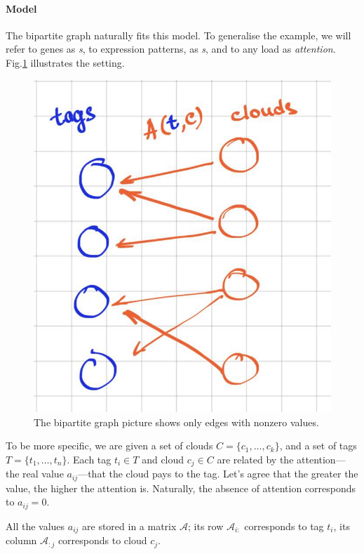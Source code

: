 \documentclass{llncs}
\begin{document}
\paragraph{Model} The bipartite graph naturally fits this model. To generalise the example, we will refer to genes as \textit{{\tag}s}, to expression patterns, as \textit{{\cloud}s}, and to any load as \textit{attention}. Fig.\ref{fig:nice_name} illustrates the setting.

\begin{figure}
    \centering
    \includegraphics[scale=.25]{bipartite.jpg}
    \caption{The bipartite graph picture shows only edges with nonzero values.}
    \label{fig:nice_name}
\end{figure}

To be more specific, we are given a set of clouds $C = \{c_1, \dots, c_k\}$, and a set of tags $T = \{t_1, \dots, t_n\}$.
Each tag $t_i \in T$ and cloud $c_j \in C$ are related by the attention---the real value $a_{ij}$---that the cloud pays to the tag.
Let's agree that the greater the value, the higher the attention is. Naturally, the absence of attention corresponds to $a_{ij} = 0$. 

All the values $a_{ij}$ are stored in a matrix $\mathcal{A}$; its row $\mathcal{A}_{i:}$ corresponds to tag $t_i$, its column $\mathcal{A}_{:j}$ corresponds to cloud $c_j$.
\end{document}
